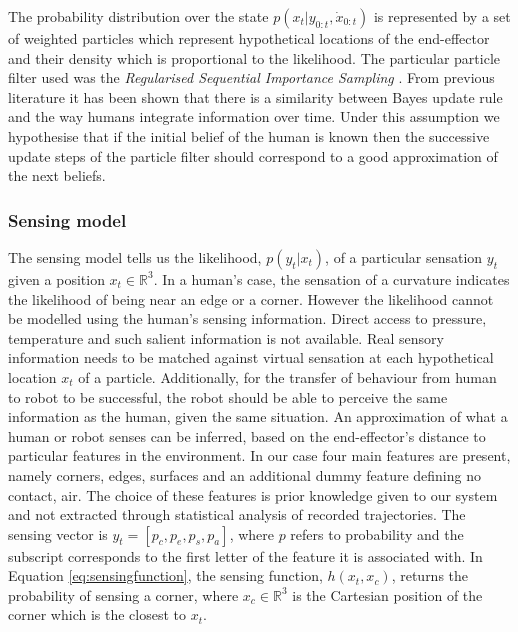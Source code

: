 The probability distribution over the state $p(x_{t}|y_{0:t},\dot{x}_{0:t})$ is represented by a set of weighted particles which represent hypothetical
locations of the end-effector and  their density which is proportional to the likelihood. The particular particle filter used was the 
\textit{Regularised Sequential Importance Sampling} \cite[p.182]{Arul_Mask_Clap_2002}. From previous literature \cite{Bake_Saxe_Tene_2011} 
it has been shown that there is a similarity between Bayes update rule and the way humans integrate information over time. Under this assumption 
we hypothesise that if the initial belief of the human is known then the successive update steps of the particle filter should correspond to a good approximation 
of the next beliefs. 

\subsubsection{Sensing model}

The sensing model tells us the likelihood, $p(y_t|x_t)$, of a particular sensation $y_t$ given
a position $x_t \in \mathbb{R}^{3}$. In a human's case, the sensation of a curvature indicates the 
likelihood of being near an edge or a corner. However the likelihood cannot be modelled using 
the human's sensing information. Direct access to pressure, temperature and such salient information is not available. 
Real sensory information needs to be matched against virtual sensation at each hypothetical location $x_t$ of a particle. 
Additionally,  for the transfer of behaviour from human to robot to be successful, the robot should be
able to perceive the same information as the human, given the same situation. An approximation of what a human or robot senses 
can be inferred, based on the end-effector's distance to particular features in the environment. In our case four main features 
are present, namely corners, edges, surfaces and an additional dummy feature defining no contact, air. The choice of these features is prior knowledge 
given to our system and not extracted through statistical analysis of recorded trajectories. The sensing vector is $y_t = \left[p_c,p_e,p_s,p_a\right]$, 
where $p$ refers to probability and the subscript corresponds to the first letter of the feature it is associated with. In Equation \ref{eq:sensingfunction}, 
the sensing function, $h(x_t,x_c)$, returns the probability of sensing a corner, where $x_c \in \mathbb{R}^3$ is the Cartesian position of the corner which is
the closest to $x_t$. 

